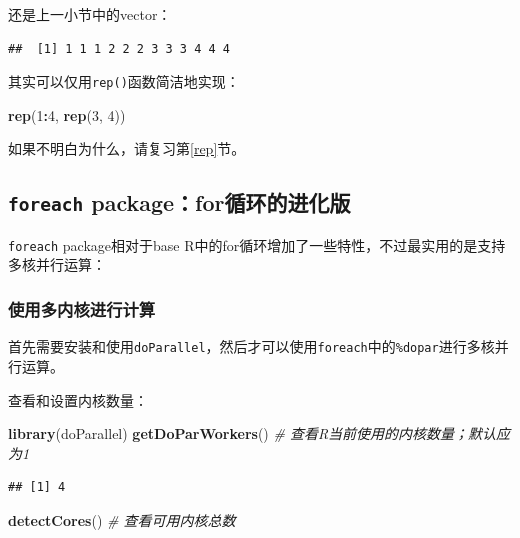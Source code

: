 \documentclass[]{book}
\newenvironment{Shaded}{\begin{snugshade}}{\end{snugshade}}
\newcommand{\CommentTok}[1]{\textcolor[rgb]{0.56,0.35,0.01}{\textit{#1}}}
\newcommand{\DecValTok}[1]{\textcolor[rgb]{0.00,0.00,0.81}{#1}}
\newcommand{\KeywordTok}[1]{\textcolor[rgb]{0.13,0.29,0.53}{\textbf{#1}}}
\newcommand{\NormalTok}[1]{#1}
\newcommand{\OperatorTok}[1]{\textcolor[rgb]{0.81,0.36,0.00}{\textbf{#1}}}
\begin{document}
还是上一小节中的vector：

\begin{verbatim}
##  [1] 1 1 1 2 2 2 3 3 3 4 4 4
\end{verbatim}

其实可以仅用\texttt{rep()}函数简洁地实现：

\begin{Shaded}
\begin{Highlighting}[]
\KeywordTok{rep}\NormalTok{(}\DecValTok{1}\OperatorTok{:}\DecValTok{4}\NormalTok{, }\KeywordTok{rep}\NormalTok{(}\DecValTok{3}\NormalTok{, }\DecValTok{4}\NormalTok{))}
\end{Highlighting}
\end{Shaded}

如果不明白为什么，请复习第\ref{rep}节。

\hypertarget{foreach}{%
\subsection{\texorpdfstring{\texttt{foreach} package：for循环的进化版}{foreach package：for循环的进化版}}\label{foreach}}

\texttt{foreach} package相对于base R中的for循环增加了一些特性，不过最实用的是支持多核并行运算：

\hypertarget{parallel}{%
\subsubsection{使用多内核进行计算}\label{parallel}}

首先需要安装和使用\texttt{doParallel}，然后才可以使用\texttt{foreach}中的\texttt{\%dopar}进行多核并行运算。

查看和设置内核数量：

\begin{Shaded}
\begin{Highlighting}[]
\KeywordTok{library}\NormalTok{(doParallel)}
\KeywordTok{getDoParWorkers}\NormalTok{() }\CommentTok{# 查看R当前使用的内核数量；默认应为1}
\end{Highlighting}
\end{Shaded}

\begin{verbatim}
## [1] 4
\end{verbatim}

\begin{Shaded}
\begin{Highlighting}[]
\KeywordTok{detectCores}\NormalTok{() }\CommentTok{# 查看可用内核总数}
\end{Highlighting}
\end{Shaded}
\end{document}

